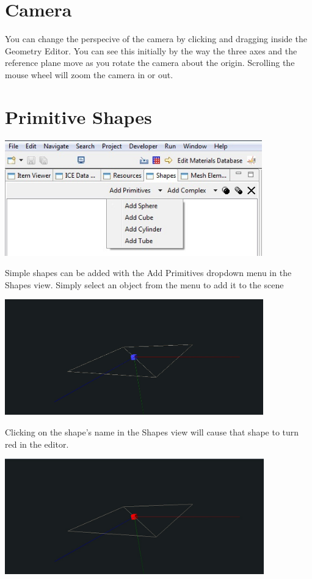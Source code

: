 \documentclass{article}
\begin{document}
\section{Camera}

You can change the perspecive of the camera by clicking and dragging inside the
Geometry Editor. You can see this initially by the way the three axes and the
reference plane move as you rotate the camera about the origin. Scrolling the
mouse wheel will zoom the camera in or out.

\section{Primitive Shapes}

\begin{center}
\includegraphics[height=5cm]{images/GeometryAddPrimitive.jpg}
\end{center}

Simple shapes can be added with the Add Primitives dropdown menu in the Shapes
view. Simply select an object from the menu to add it to the scene

\begin{center}
\includegraphics[height=5cm]{images/GeometryAddCube.jpg}
\end{center}

Clicking on the shape's name in the Shapes view will cause that shape to turn
red in the editor.

\begin{center}
\includegraphics[height=5cm]{images/GeometrySelectCube.jpg}
\end{center}
\end{document}
